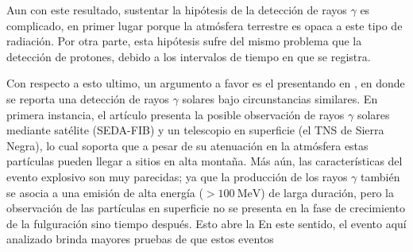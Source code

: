 Aun con este resultado, sustentar la hipótesis de la detección de rayos $\gamma$ es complicado, en primer lugar porque la atmósfera terrestre es opaca a este tipo de radiación. Por otra parte, esta hipótesis sufre del mismo problema que la detección de protones, debido a los intervalos de tiempo en que se registra.

Con respecto a esto ultimo, un argumento a favor es el presentando en \cite{muraki20}, en donde se reporta una detección de rayos $\gamma$ solares bajo circunstancias similares. En primera instancia, el artículo presenta la posible observación de rayos $\gamma$ solares mediante satélite (SEDA-FIB) y un telescopio en superficie (el TNS de Sierra Negra), lo cual soporta que a pesar de su atenuación en la atmósfera estas partículas pueden llegar a sitios en alta montaña. Más aún, las características del evento explosivo son muy parecidas; ya que la producción de los rayos $\gamma$ también se asocia a una emisión de alta energía ($>\SI{100}{\mega\electronvolt}$) de larga duración, pero la observación de las partículas en superficie no se presenta en la fase de crecimiento de la fulguración sino tiempo después. Esto abre la  En este sentido, el evento aquí analizado brinda mayores pruebas de que estos eventos
